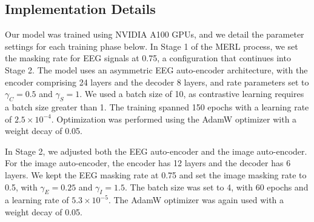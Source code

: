 \documentclass[conference]{IEEEtran}
\begin{document}

\subsection{Implementation Details}
Our model was trained using NVIDIA A100 GPUs, and we detail the parameter settings for each training phase below. In Stage 1 of the MERL process, we set the masking rate for EEG signals at 0.75, a configuration that continues into Stage 2. The model uses an asymmetric EEG auto-encoder architecture, with the encoder comprising 24 layers and the decoder 8 layers, and rate parameters set to \( \gamma_C = 0.5 \) and \( \gamma_S = 1 \). We used a batch size of 10, as contrastive learning requires a batch size greater than 1. The training spanned 150 epochs with a learning rate of \( 2.5 \times 10^{-4} \). Optimization was performed using the AdamW \cite{b27} optimizer with a weight decay of 0.05.

In Stage 2, we adjusted both the EEG auto-encoder and the image auto-encoder. For the image auto-encoder, the encoder has 12 layers and the decoder has 6 layers. We kept the EEG masking rate at 0.75 and set the image masking rate to 0.5, with \( \gamma_E = 0.25 \) and \( \gamma_I = 1.5 \). The batch size was set to 4, with 60 epochs and a learning rate of \( 5.3 \times 10^{-5} \). The AdamW optimizer was again used with a weight decay of 0.05.
\end{document}
